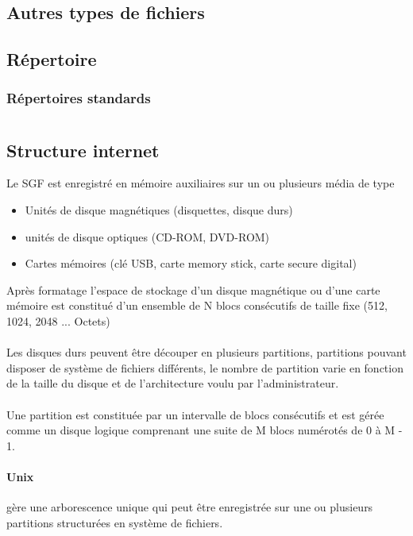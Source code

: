 \documentclass[12pt,a4paper,openany]{book}
\begin{document}
		\subsection{Autres types de fichiers}
		\subsection{Répertoire}
			\subsubsection{Répertoires standards}
	\section{}
			\subsection{Structure internet}
			Le SGF est enregistré en mémoire auxiliaires sur un ou plusieurs
			média de type
			\begin{itemize}
				\item Unités de disque magnétiques (disquettes, disque durs)
				\item unités de disque optiques (CD-ROM, DVD-ROM)
				\item Cartes mémoires (clé USB, carte memory stick, carte secure digital)
			\end{itemize}
			Après formatage l'espace de stockage d'un disque magnétique ou d'une carte
			mémoire est constitué d'un ensemble de N blocs consécutifs de taille fixe
			(512, 1024, 2048 ... Octets)
			\paragraph{} Les disques durs peuvent être découper en plusieurs partitions,
			partitions pouvant disposer de système de fichiers différents, le 
			nombre de partition varie en fonction de la taille du disque et de 
			l'architecture voulu par l'administrateur. 
			\paragraph{}
			Une partition est constituée par un intervalle de blocs consécutifs 
			et est gérée comme un disque logique comprenant une suite de M blocs 
			numérotés de 0 à M - 1.
			\paragraph{Unix}
			gère une arborescence unique qui peut être
			enregistrée sur une ou plusieurs partitions structurées en système
			de fichiers.
\end{document}
